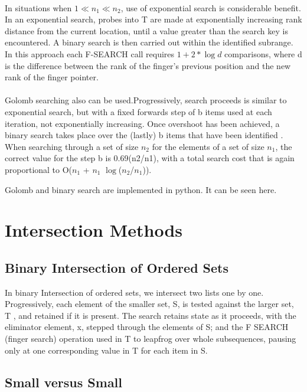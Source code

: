 \documentclass[paper=a4, fontsize=11pt]{scrartcl} %
\numberwithin{equation}{section} %
\numberwithin{figure}{section} %
\numberwithin{table}{section} %
\begin{document}
\paragraph{}
In situations when $1 \ll  n_{1} \ll  n_{2} $, use of exponential search is considerable benefit. In an exponential search, probes into T are made at exponentially increasing rank distance from the current location, until a value greater than the search key is encountered. A binary search is then carried out within the identified subrange. In this approach each F-SEARCH call requires $1+2* \log d$ comparisons, where d is the difference between the rank of the finger's previous position and the new rank of the finger pointer. 

\paragraph{}
Golomb searching also can be used.Progressively, search proceeds is similar to exponential search, but with a fixed forwards step of b items used at each iteration, not exponentially increasing. Once overshoot has been achieved, a binary search takes place over the (lastly) b items that have been identified . When searching through a set of size $n_{2}$ for the elements of a set of size $n_{1}$, the correct value for the step b is 0.69(n2/n1), with a total search cost that is again proportional to O($n_{1}$ + $n_{1}$ $\log$($n_{2}$/$n_{1}$)).

Golomb and binary search are implemented in python. It can be seen here.

\newpage
\section{Intersection Methods}

\subsection{Binary Intersection of Ordered Sets}
In binary Intersection of ordered sets, we intersect two lists one by one. Progressively,
each element of the smaller set, S, is tested against the larger set, T , and retained if it is present. The search retains state as it proceeds, with the eliminator element, x, stepped through the elements of S; and the F SEARCH (finger search) operation used in T to leapfrog over whole subsequences, pausing only at one corresponding value in T for each item in S. 


\subsection{Small versus Small}
\end{document}

